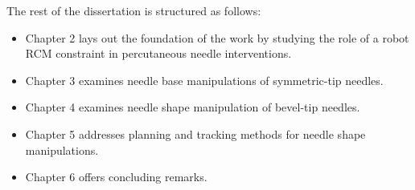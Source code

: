   The rest of the dissertation is structured as follows:
  \begin{itemize}
  \item Chapter 2 lays out the foundation of the work by studying the role of a robot RCM constraint in percutaneous needle interventions.
  \item Chapter 3 examines needle base manipulations of symmetric-tip needles.
  \item Chapter 4 examines needle shape manipulation of bevel-tip needles.
  \item Chapter 5 addresses planning and tracking methods for needle shape manipulations.
  \item Chapter 6 offers concluding remarks.
  \end{itemize}
